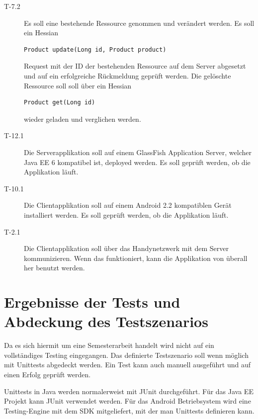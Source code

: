 \documentclass[abstracton, listof=totocnumbered,
bibliography=totocnumbered]{scrreprt}
\begin{document}
\begin{description}
    \item[T-7.2] Es soll eine bestehende Ressource genommen und
    verändert werden. Es soll ein Hessian 
    \begin{verbatim}Product update(Long id, Product product)\end{verbatim}
    Request mit der ID der bestehenden Ressource auf dem Server abgesetzt und
    auf ein erfolgreiche Rückmeldung geprüft werden. Die gelöschte Ressource
    soll soll über ein Hessian
    \begin{verbatim}Product get(Long id)\end{verbatim} 
    wieder geladen und verglichen werden.
    \newline
    
    \item[T-12.1] Die Serverapplikation soll auf einem GlassFish Application
    Server, welcher Java EE 6 kompatibel ist, deployed werden. Es soll geprüft
    werden, ob die Applikation läuft.
    \newline
         
    \item[T-10.1] Die Clientapplikation soll auf einem Android 2.2
    kompatiblen Gerät installiert werden. Es soll geprüft werden, ob die
    Applikation läuft.
    \newline
    
    \item[T-2.1] Die Clientapplikation soll über das Handynetzwerk mit dem
    Server kommunizieren. Wenn das funktioniert, kann die Applikation von
    überall her benutzt werden.
    
  \end{description}
  
  \newpage
  
  \chapter{Ergebnisse der Tests und Abdeckung des Testszenarios}
  
  Da es sich hiermit um eine Semesterarbeit handelt wird nicht auf ein
  vollständiges Testing eingegangen. Das definierte Testszenario soll wenn
  möglich mit Unittests abgedeckt werden. Ein Test kann auch manuell ausgeführt
  und auf einen Erfolg geprüft werden.
  
  Unittests in Java werden normalerweist mit JUnit durchgeführt. Für das Java
  EE Projekt kann JUnit verwendet werden. Für das Android Betriebsystem wird
  eine Testing-Engine mit dem SDK mitgeliefert, mit der man Unittests definieren kann.
  
\end{document}

